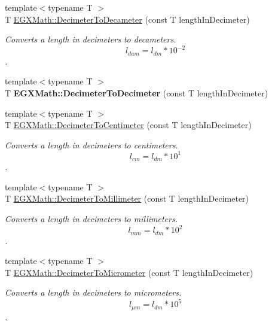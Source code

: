 \begin{DoxyCompactItemize}
{\footnotesize template$<$typename T $>$ }\\T \mbox{\hyperlink{group___e_g_x_math-_conversions-_length_conversions-_s_i-_decimeter-_s_i_ga20742de42223dbcd8af88e4e9feccfa4}{E\+G\+X\+Math\+::\+Decimeter\+To\+Decameter}} (const T length\+In\+Decimeter)
\begin{DoxyCompactList}\small\item\em Converts a length in decimeters to decameters. \[ l_{dam}=l_{dm} * 10^{-2} \]. \end{DoxyCompactList}\item 
\mbox{\label{_decimeter_conversion_8inl_a83cd94c185c48711bfad26c472f1a4b0}} 
{\footnotesize template$<$typename T $>$ }\\T {\bfseries E\+G\+X\+Math\+::\+Decimeter\+To\+Decimeter} (const T length\+In\+Decimeter)
\item 
{\footnotesize template$<$typename T $>$ }\\T \mbox{\hyperlink{group___e_g_x_math-_conversions-_length_conversions-_s_i-_decimeter-_s_i_ga032e40ec973eb890908799b87ba41710}{E\+G\+X\+Math\+::\+Decimeter\+To\+Centimeter}} (const T length\+In\+Decimeter)
\begin{DoxyCompactList}\small\item\em Converts a length in decimeters to centimeters. \[ l_{cm}=l_{dm} * 10^{1} \]. \end{DoxyCompactList}\item 
{\footnotesize template$<$typename T $>$ }\\T \mbox{\hyperlink{group___e_g_x_math-_conversions-_length_conversions-_s_i-_decimeter-_s_i_gad899e8bf5ade8cdc82e00b0fc81c2ee5}{E\+G\+X\+Math\+::\+Decimeter\+To\+Millimeter}} (const T length\+In\+Decimeter)
\begin{DoxyCompactList}\small\item\em Converts a length in decimeters to millimeters. \[ l_{mm}=l_{dm} * 10^{2} \]. \end{DoxyCompactList}\item 
{\footnotesize template$<$typename T $>$ }\\T \mbox{\hyperlink{group___e_g_x_math-_conversions-_length_conversions-_s_i-_decimeter-_s_i_ga5cf28083fa005b5a6a0dd6817c1633b7}{E\+G\+X\+Math\+::\+Decimeter\+To\+Micrometer}} (const T length\+In\+Decimeter)
\begin{DoxyCompactList}\small\item\em Converts a length in decimeters to micrometers. \[ l_{\mu m}=l_{dm} * 10^{5} \]. \end{DoxyCompactList}\item 

\end{DoxyCompactItemize}
